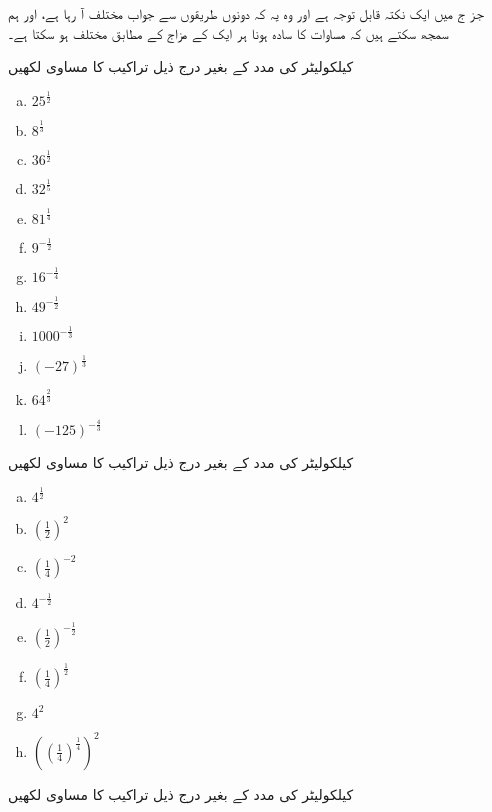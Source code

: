 جز ج میں ایک نکتہ قابل توجہ ہے اور وہ یہ کہ دونوں طریقوں سے جواب مختلف آ رہا ہے، اور ہم سمجھ سکتے ہیں کہ مساوات کا سادہ ہونا ہر ایک کے مزاج کے مطابق مختلف ہو سکتا ہے۔



کیلکولیٹر کی مدد کے بغیر درج ذیل تراکیب کا مساوی لکھیں

\begin{multicols}{4}
\begin{enumerate}[a.]
\item
\(25^{\frac{1}{2}}\)
\item
\(8^{\frac{1}{3}}\)
\item
\(36^{\frac{1}{2}}\)
\item
\(32^{\frac{1}{5}}\)
\item
\(81^{\frac{1}{4}}\)
\item
\(9^{-\frac{1}{2}}\)
\item
\(16^{-\frac{1}{4}}\)
\item
\(49^{-\frac{1}{2}}\)
\item
\(1000^{-\frac{1}{3}}\)
\item
\((-27)^{\frac{1}{3}}\)
\item
\(64^{\frac{2}{3}}\)
\item
\((-125)^{-\frac{4}{3}}\)
\end{enumerate}
\end{multicols}


کیلکولیٹر کی مدد کے بغیر درج ذیل تراکیب کا مساوی لکھیں

\begin{multicols}{4}
\begin{enumerate}[a.]
\item
\(4^{\frac{1}{2}}\)
\item
\((\frac{1}{2})^{2}\)
\item
\((\frac{1}{4})^{-2}\)
\item
\(4^{-\frac{1}{2}}\)
\item
\((\frac{1}{2})^{-\frac{1}{2}}\)
\item
\((\frac{1}{4})^{\frac{1}{2}}\)
\item
\(4^{2}\)
\item
\(((\frac{1}{4})^{\frac{1}{4}})^{2}\)
\end{enumerate}
\end{multicols}



کیلکولیٹر کی مدد کے بغیر درج ذیل تراکیب کا مساوی لکھیں

